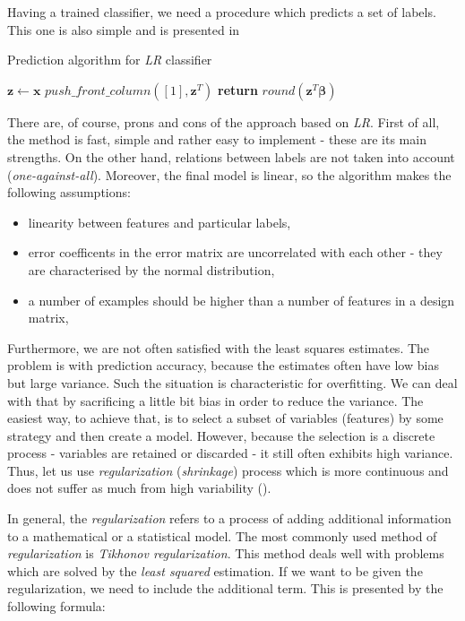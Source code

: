 Having a trained classifier, we need a procedure which predicts a set of labels. This one is also simple and is presented in 

\begin{algorithm}
    \caption{Prediction algorithm for \textit{LR} classifier}\label{alg:CL1}
    \begin{algorithmic}[1]
        \State $\boldsymbol{z} \gets \boldsymbol{x}$ 
        \State $push\_front\_column([1], \boldsymbol{z}^T)$ 
        \State \textbf{return} $round(\boldsymbol{z}^T\boldsymbol{\beta})$
    \EndProcedure
    \end{algorithmic}
\end{algorithm}

There are, of course, prons and cons of the approach based on \textit{LR}. First of all, the method is fast, simple and rather easy to implement - these are its main strengths. On the other hand, relations between labels are not taken into account (\textit{one-against-all}). Moreover, the final model is linear, so the algorithm makes the following assumptions:

\begin{itemize}
    \item linearity between features and particular labels,
    \item error coefficents in the error matrix are uncorrelated with each other - they are characterised by the normal distribution,
    \item a number of examples should be higher than a number of features in a design matrix,
\end{itemize}

Furthermore, we are not often satisfied with the least squares estimates. The problem is with prediction accuracy, because the estimates often have low bias but large variance. Such the situation is characteristic for overfitting. We can deal with that by sacrificing a little bit bias in order to reduce the variance. The easiest way, to achieve that, is to select a subset of variables (features) by some strategy and then create a model. However, because the selection is a discrete process - variables are retained or discarded - it still often exhibits high variance. Thus, let us use \textit{regularization} (\textit{shrinkage}) process which is more continuous and does not suffer as much from high variability (\cite{Trevor}).

In general, the \textit{regularization} refers to a process of adding additional information to a mathematical or a statistical model. The most commonly used method of \textit{regularization} is \textit{Tikhonov regularization}. This method deals well with problems which are solved by the \textit{least squared} estimation. If we want  to be given the regularization, we need to include the additional term. This is presented by the following formula:

